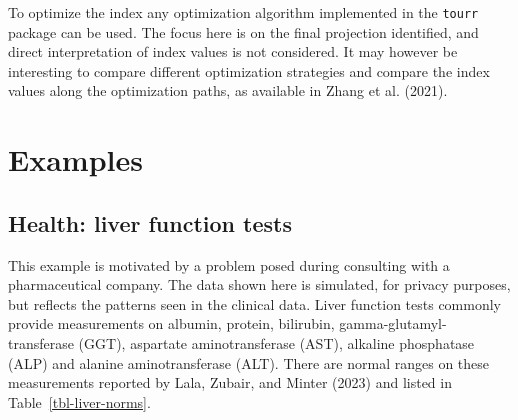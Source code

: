 \documentclass[
  12pt,
]{interact}
\begin{document}
To optimize the index any optimization algorithm implemented in the
\texttt{tourr} package can be used. The focus here is on the final
projection identified, and direct interpretation of index values is not
considered. It may however be interesting to compare different
optimization strategies and compare the index values along the
optimization paths, as available in Zhang et al. (2021).

\section{Examples}\label{sec-examples}

\subsection{Health: liver function
tests}\label{health-liver-function-tests}

This example is motivated by a problem posed during consulting with a
pharmaceutical company. The data shown here is simulated, for privacy
purposes, but reflects the patterns seen in the clinical data. Liver
function tests commonly provide measurements on albumin, protein,
bilirubin, gamma-glutamyl-transferase (GGT), aspartate aminotransferase
(AST), alkaline phosphatase (ALP) and alanine aminotransferase (ALT).
There are normal ranges on these measurements reported by Lala, Zubair,
and Minter (2023) and listed in Table~\ref{tbl-liver-norms}.
\end{document}
